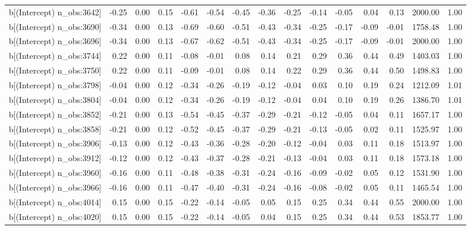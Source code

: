 \begin{table}[ht]
\begin{tabular}{rrrrrrrrrrrrrrr}
  b[(Intercept) n\_obs:3642] & -0.25 & 0.00 & 0.15 & -0.61 & -0.54 & -0.45 & -0.36 & -0.25 & -0.14 & -0.05 & 0.04 & 0.13 & 2000.00 & 1.00 \\ 
  b[(Intercept) n\_obs:3690] & -0.34 & 0.00 & 0.13 & -0.69 & -0.60 & -0.51 & -0.43 & -0.34 & -0.25 & -0.17 & -0.09 & -0.01 & 1758.48 & 1.00 \\ 
  b[(Intercept) n\_obs:3696] & -0.34 & 0.00 & 0.13 & -0.67 & -0.62 & -0.51 & -0.43 & -0.34 & -0.25 & -0.17 & -0.09 & -0.01 & 2000.00 & 1.00 \\ 
  b[(Intercept) n\_obs:3744] & 0.22 & 0.00 & 0.11 & -0.08 & -0.01 & 0.08 & 0.14 & 0.21 & 0.29 & 0.36 & 0.44 & 0.49 & 1403.03 & 1.00 \\ 
  b[(Intercept) n\_obs:3750] & 0.22 & 0.00 & 0.11 & -0.09 & -0.01 & 0.08 & 0.14 & 0.22 & 0.29 & 0.36 & 0.44 & 0.50 & 1498.83 & 1.00 \\ 
  b[(Intercept) n\_obs:3798] & -0.04 & 0.00 & 0.12 & -0.34 & -0.26 & -0.19 & -0.12 & -0.04 & 0.03 & 0.10 & 0.19 & 0.24 & 1212.09 & 1.01 \\ 
  b[(Intercept) n\_obs:3804] & -0.04 & 0.00 & 0.12 & -0.34 & -0.26 & -0.19 & -0.12 & -0.04 & 0.04 & 0.10 & 0.19 & 0.26 & 1386.70 & 1.01 \\ 
  b[(Intercept) n\_obs:3852] & -0.21 & 0.00 & 0.13 & -0.54 & -0.45 & -0.37 & -0.29 & -0.21 & -0.12 & -0.05 & 0.04 & 0.11 & 1657.17 & 1.00 \\ 
  b[(Intercept) n\_obs:3858] & -0.21 & 0.00 & 0.12 & -0.52 & -0.45 & -0.37 & -0.29 & -0.21 & -0.13 & -0.05 & 0.02 & 0.11 & 1525.97 & 1.00 \\ 
  b[(Intercept) n\_obs:3906] & -0.13 & 0.00 & 0.12 & -0.43 & -0.36 & -0.28 & -0.20 & -0.12 & -0.04 & 0.03 & 0.11 & 0.18 & 1513.97 & 1.00 \\ 
  b[(Intercept) n\_obs:3912] & -0.12 & 0.00 & 0.12 & -0.43 & -0.37 & -0.28 & -0.21 & -0.13 & -0.04 & 0.03 & 0.11 & 0.18 & 1573.18 & 1.00 \\ 
  b[(Intercept) n\_obs:3960] & -0.16 & 0.00 & 0.11 & -0.48 & -0.38 & -0.31 & -0.24 & -0.16 & -0.09 & -0.02 & 0.05 & 0.12 & 1531.90 & 1.00 \\ 
  b[(Intercept) n\_obs:3966] & -0.16 & 0.00 & 0.11 & -0.47 & -0.40 & -0.31 & -0.24 & -0.16 & -0.08 & -0.02 & 0.05 & 0.11 & 1465.54 & 1.00 \\ 
  b[(Intercept) n\_obs:4014] & 0.15 & 0.00 & 0.15 & -0.22 & -0.14 & -0.05 & 0.05 & 0.15 & 0.25 & 0.34 & 0.44 & 0.55 & 2000.00 & 1.00 \\ 
  b[(Intercept) n\_obs:4020] & 0.15 & 0.00 & 0.15 & -0.22 & -0.14 & -0.05 & 0.04 & 0.15 & 0.25 & 0.34 & 0.44 & 0.53 & 1853.77 & 1.00 \\ 

\end{tabular}
\end{table}
